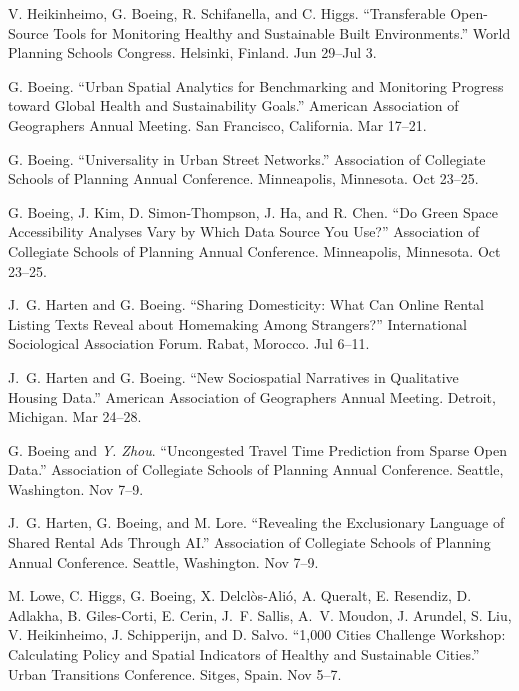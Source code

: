 \documentclass[11pt,letterpaper]{report} %
\begin{document}
\begin{tablist}
\item[2026] \tab{}V. Heikinheimo, G. Boeing, R. Schifanella, and C. Higgs. \enquote{Transferable Open-Source Tools for Monitoring Healthy and Sustainable Built Environments.} World Planning Schools Congress. Helsinki, Finland. Jun 29--Jul 3.

\item[2026] \tab{}G. Boeing. \enquote{Urban Spatial Analytics for Benchmarking and Monitoring Progress toward Global Health and Sustainability Goals.} American Association of Geographers Annual Meeting. San Francisco, California. Mar 17--21.

\item[2025] \tab{}G. Boeing. \enquote{Universality in Urban Street Networks.} Association of Collegiate Schools of Planning Annual Conference. Minneapolis, Minnesota. Oct 23--25.

\item[2025] \tab{}G. Boeing, J. Kim, D. Simon-Thompson, J. Ha, and R. Chen. \enquote{Do Green Space Accessibility Analyses Vary by Which Data Source You Use?} Association of Collegiate Schools of Planning Annual Conference. Minneapolis, Minnesota. Oct 23--25.

\item[2025] \tab{}J.~G. Harten and G. Boeing. \enquote{Sharing Domesticity: What Can Online Rental Listing Texts Reveal about Homemaking Among Strangers?} International Sociological Association Forum. Rabat, Morocco. Jul 6--11.

\item[2025] \tab{}J.~G. Harten and G. Boeing. \enquote{New Sociospatial Narratives in Qualitative Housing Data.} American Association of Geographers Annual Meeting. Detroit, Michigan. Mar 24--28.

\item[2024] \tab{}G. Boeing and \textit{Y. Zhou}. \enquote{Uncongested Travel Time Prediction from Sparse Open Data.} Association of Collegiate Schools of Planning Annual Conference. Seattle, Washington. Nov 7--9.

\item[2024] \tab{}J.~G. Harten, G. Boeing, and M. Lore. \enquote{Revealing the Exclusionary Language of Shared Rental Ads Through AI.} Association of Collegiate Schools of Planning Annual Conference. Seattle, Washington. Nov 7--9.

\item[2024] \tab{}M. Lowe, C. Higgs, G. Boeing, X. Delclòs-Alió, A. Queralt, E. Resendiz, D. Adlakha, B. Giles-Corti, E. Cerin, J.~F. Sallis, A.~V. Moudon, J. Arundel, S. Liu, V. Heikinheimo, J. Schipperijn, and D. Salvo. \enquote{1,000 Cities Challenge Workshop: Calculating Policy and Spatial Indicators of Healthy and Sustainable Cities.} Urban Transitions Conference. Sitges, Spain. Nov 5--7.


\end{tablist}
\end{document}
